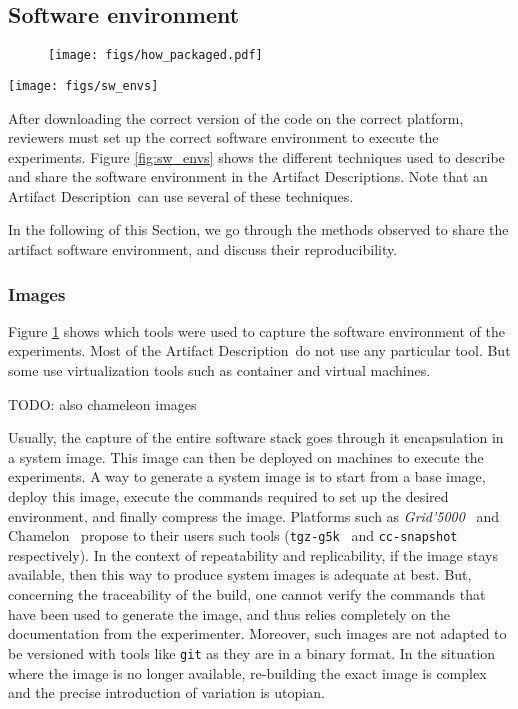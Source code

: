 \documentclass[sigconf]{acmart}
\newcommand{\grid}{\emph{Grid'5000}}
\newcommand{\ad}{Artifact Description}
\newcommand{\todo}[1]{{\color{red}TODO: #1}}
\begin{document}
\subsection{Software environment}\label{sec:sop:sw}

\begin{figure}
  \centering
    \texttt{[image: figs/how\_packaged.pdf]}
  \caption{}\label{fig:techno}
\end{figure}

\begin{figure*}
  \centering
  \texttt{[image: figs/sw\_envs]}
  \caption{}\label{fig:sw_envs}
\end{figure*}

After downloading the correct version of the code on the correct platform, reviewers must set up the correct software environment to execute the experiments.
Figure \ref{fig:sw_envs} shows the different techniques used to describe and share the software environment in the \ad s.
Note that an \ad\ can use several of these techniques.

In the following of this Section, we go through the methods observed to share the artifact software environment, and discuss their reproducibility.

\subsubsection{Images}

Figure \ref{fig:techno} shows which tools were used to capture the software environment of the experiments.
Most of the \ad\ do not use any particular tool.
But some use virtualization tools such as container and virtual machines.

\todo{also chameleon images}

Usually, the capture of the entire software stack goes through it encapsulation in a system image.
This image can then be deployed on machines to execute the experiments.
A way to generate a system image is to start from a base image, deploy this image, execute the commands required to set up the desired environment, and finally compress the image.
Platforms such as \grid\ \cite{grid5000} and Chamelon\ \cite{chameleon} propose to their users such tools (\texttt{tgz-g5k}\ \cite{tgz-g5k} and \texttt{cc-snapshot}\ \cite{cc-snapshot} respectively).
In the context of repeatability and replicability, if the image stays available, then this way to produce system images is adequate at best.
But, concerning the traceability of the build, one cannot verify the commands that have been used to generate the image, and thus relies completely on the documentation from the experimenter.
Moreover, such images are not adapted to be versioned with tools like \texttt{git} as they are in a binary format.
In the situation where the image is no longer available, re-building the exact image is complex and the precise introduction of variation is utopian.
\end{document}
